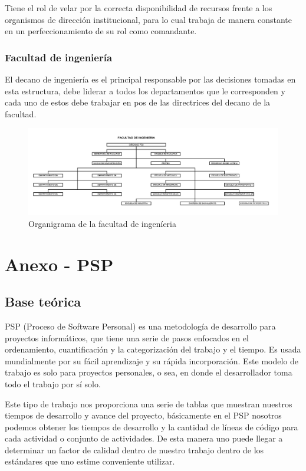 \documentclass[a4paper,12pt,openany,oneside]{book}
\begin{document}
Tiene el rol de velar por la correcta disponibilidad de recursos frente a los organismos de dirección institucional, para lo cual trabaja de manera constante en un perfeccionamiento de su rol como comandante.

\subsection{Facultad de ingeniería}
El decano de ingeniería es el principal responsable por las decisiones tomadas en esta estructura, debe liderar a todos los departamentos que le corresponden y cada uno de estos debe trabajar en pos de las directrices del decano de la facultad.
\begin{figure}[!hbp]
\begin{center}
\includegraphics[scale=0.45,angle=0]{images/organigrama/11.png}
\caption{Organigrama de la facultad de ingen\'ieria}
\label{Organigrama de la facultad de ingenieria}
\end{center}
\end{figure}
\chapter{Anexo - PSP}
\thispagestyle{empty}
\section{Base teórica}
PSP (Proceso de Software Personal) es una metodología de desarrollo para proyectos informáticos, que tiene una serie de pasos enfocados en el ordenamiento, cuantificación y la categorización del trabajo y el tiempo. Es usada mundialmente por su fácil aprendizaje y su rápida incorporación. Este modelo de trabajo es solo para proyectos personales, o sea, en donde el desarrollador toma todo el trabajo por sí solo.

Este tipo de trabajo nos proporciona una serie de tablas que muestran nuestros tiempos de desarrollo y avance del proyecto, básicamente en el PSP nosotros podemos obtener los tiempos de desarrollo y la cantidad de líneas de código para cada actividad o conjunto de actividades. De esta manera uno puede llegar a determinar un factor de calidad dentro de nuestro trabajo dentro de los estándares que uno estime conveniente utilizar.
\end{document}
